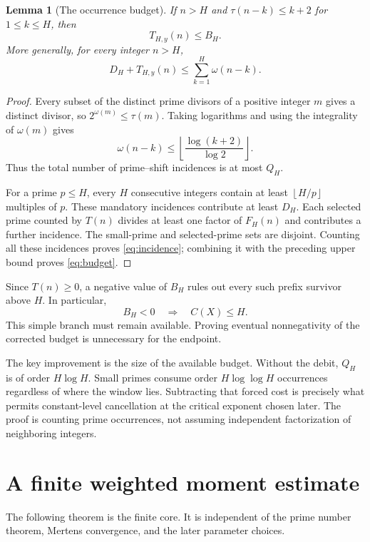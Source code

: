 \documentclass[11pt,a4paper]{article}
\newtheorem{lemma}[theorem]{Lemma}
\theoremstyle{definition}
\theoremstyle{remark}
\numberwithin{equation}{section}
\newcommand{\floor}[1]{\left\lfloor #1\right\rfloor}
\begin{document}
\begin{lemma}[The occurrence budget]\label{lem:debit}
If $n>H$ and $\tau(n-k)\le k+2$ for $1\le k\le H$, then
\begin{equation}\label{eq:budget}
 T_{H,y}(n)\le B_H.
\end{equation}
More generally, for every integer $n>H$,
\begin{equation}\label{eq:incidence}
 D_H+T_{H,y}(n)\le\sum_{k=1}^H\omega(n-k).
\end{equation}
\end{lemma}
\begin{proof}
Every subset of the distinct prime divisors of a positive integer $m$ gives a
distinct divisor, so $2^{\omega(m)}\le\tau(m)$. Taking logarithms and using the
integrality of $\omega(m)$ gives
\[
 \omega(n-k)\le\floor{\frac{\log(k+2)}{\log2}}.
\]
Thus the total number of prime--shift incidences is at most $Q_H$.

For a prime $p\le H$, every $H$ consecutive integers contain at least
$\floor{H/p}$ multiples of $p$. These mandatory incidences contribute at least
$D_H$. Each selected prime counted by $T(n)$ divides at least one factor of
$F_H(n)$ and contributes a further incidence. The small-prime and selected-prime
sets are disjoint. Counting all these incidences proves \eqref{eq:incidence};
combining it with the preceding upper bound proves \eqref{eq:budget}.
\end{proof}
Since $T(n)\ge0$, a negative value of $B_H$ rules out every such prefix survivor
above $H$. In particular,
\begin{equation}\label{eq:negative-budget}
 B_H<0\quad\Longrightarrow\quad C(X)\le H.
\end{equation}
This simple branch must remain available. Proving eventual nonnegativity of
the corrected budget is unnecessary for the endpoint.

The key improvement is the size of the available budget. Without the debit,
$Q_H$ is of order $H\log H$. Small primes consume order $H\log\log H$
occurrences regardless of where the window lies. Subtracting that forced cost
is precisely what permits constant-level cancellation at the critical exponent
chosen later. The proof is counting prime occurrences, not assuming independent
factorization of neighboring integers.

\section{A finite weighted moment estimate}\label{sec:moment}
The following theorem is the finite core. It is independent of the prime number
theorem, Mertens convergence, and the later parameter choices.
\end{document}
